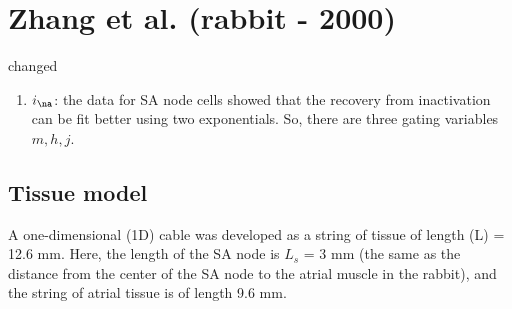 \section{Zhang et al. (rabbit - 2000)}
\label{sec:SA_node_Zhang2000}


\citep{zhang2000} changed
\begin{enumerate}
  \item $i_\na$: the data for SA node cells showed that the recovery from
  inactivation can be fit better using two exponentials. So, there are three
  gating variables $m, h, j$.
\end{enumerate}


\subsection{Tissue model}

A one-dimensional (1D) cable was developed as a string of tissue of length (L)
= 12.6 mm. Here, the length of the SA node is $L_s$ = 3 mm (the same as the
distance from the center of the SA node to the atrial muscle in the rabbit), and
the string of atrial tissue is of length 9.6 mm. 


